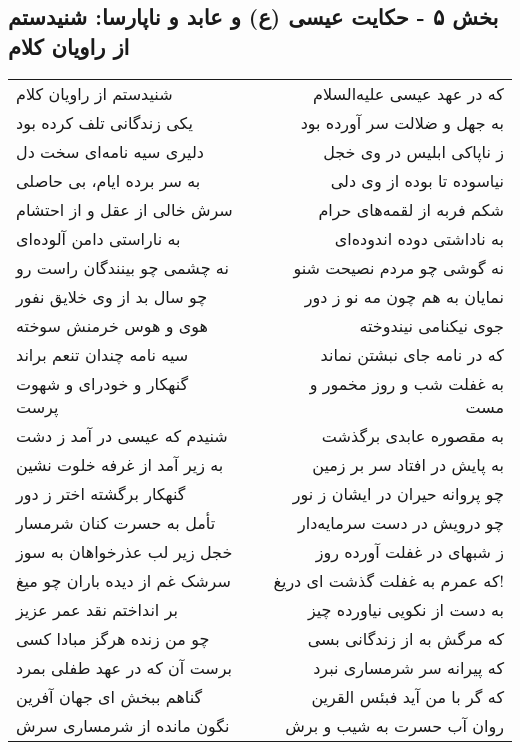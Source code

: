 \begin{center}
\section*{بخش ۵ - حکایت عیسی (ع) و عابد و ناپارسا: شنیدستم از راویان کلام}
\label{sec:005}
\begin{longtable}{l p{0.5cm} r}
شنیدستم از راویان کلام
&&
که در عهد عیسی علیه‌السلام
\\
یکی زندگانی تلف کرده بود
&&
به جهل و ضلالت سر آورده بود
\\
دلیری سیه نامه‌ای سخت دل
&&
ز ناپاکی ابلیس در وی خجل
\\
به سر برده ایام، بی حاصلی
&&
نیاسوده تا بوده از وی دلی
\\
سرش خالی از عقل و از احتشام
&&
شکم فربه از لقمه‌های حرام
\\
به ناراستی دامن آلوده‌ای
&&
به ناداشتی دوده اندوده‌ای
\\
نه چشمی چو بینندگان راست رو
&&
نه گوشی چو مردم نصیحت شنو
\\
چو سال بد از وی خلایق نفور
&&
نمایان به هم چون مه نو ز دور
\\
هوی و هوس خرمنش سوخته
&&
جوی نیکنامی نیندوخته
\\
سیه نامه چندان تنعم براند
&&
که در نامه جای نبشتن نماند
\\
گنهکار و خودرای و شهوت پرست
&&
به غفلت شب و روز مخمور و مست
\\
شنیدم که عیسی در آمد ز دشت
&&
به مقصوره عابدی برگذشت
\\
به زیر آمد از غرفه خلوت نشین
&&
به پایش در افتاد سر بر زمین
\\
گنهکار برگشته اختر ز دور
&&
چو پروانه حیران در ایشان ز نور
\\
تأمل به حسرت کنان شرمسار
&&
چو درویش در دست سرمایه‌دار
\\
خجل زیر لب عذرخواهان به سوز
&&
ز شبهای در غفلت آورده روز
\\
سرشک غم از دیده باران چو میغ
&&
که عمرم به غفلت گذشت ای دریغ!
\\
بر انداختم نقد عمر عزیز
&&
به دست از نکویی نیاورده چیز
\\
چو من زنده هرگز مبادا کسی
&&
که مرگش به از زندگانی بسی
\\
برست آن که در عهد طفلی بمرد
&&
که پیرانه سر شرمساری نبرد
\\
گناهم ببخش ای جهان آفرین
&&
که گر با من آید فبئس القرین
\\
نگون مانده از شرمساری سرش
&&
روان آب حسرت به شیب و برش
\\

\end{longtable}
\end{center}
